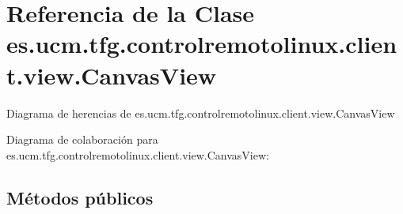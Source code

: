 \hypertarget{classes_1_1ucm_1_1tfg_1_1controlremotolinux_1_1client_1_1view_1_1CanvasView}{\section{Referencia de la Clase es.\-ucm.\-tfg.\-controlremotolinux.\-client.\-view.\-Canvas\-View}
\label{classes_1_1ucm_1_1tfg_1_1controlremotolinux_1_1client_1_1view_1_1CanvasView}
}


Diagrama de herencias de es.\-ucm.\-tfg.\-controlremotolinux.\-client.\-view.\-Canvas\-View


Diagrama de colaboración para es.\-ucm.\-tfg.\-controlremotolinux.\-client.\-view.\-Canvas\-View\-:
\subsection*{Métodos públicos}
